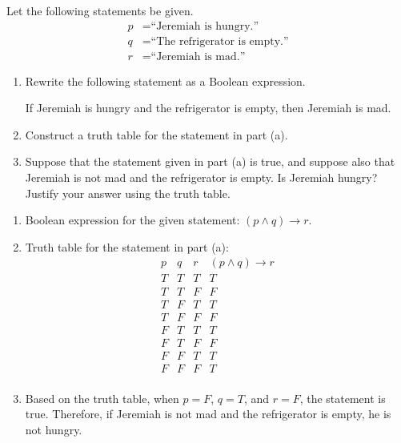 \documentclass{article}
\theoremstyle{definition}
\begin{document}
\begin{question}
	Let the following statements be given.
		\begin{align*}
		p &= \text{``Jeremiah is hungry.''}\\
		q &= \text{``The refrigerator is empty.''}\\
		r &= \text{``Jeremiah is mad.''}
		\end{align*}
	\begin{enumerate}
		\item Rewrite the following statement as a Boolean expression.\\
			\begin{center}
			If Jeremiah is hungry and the refrigerator is empty, then Jeremiah is mad.
			\end{center}
		\item Construct a truth table for the statement in part (a).
		\item Suppose that the statement given in part (a) is true, and suppose also that Jeremiah is not mad and the refrigerator is empty. Is Jeremiah hungry? Justify your answer using the truth table.
	\end{enumerate}
\end{question}
\begin{solution}
    \begin{enumerate}
        \item Boolean expression for the given statement: $(p \land q) \rightarrow r$.
        \item Truth table for the statement in part (a):
        \[
        \begin{array}{cccc}
            p & q & r & (p \land q) \rightarrow r \\
            \hline
            T & T & T & T \\
            T & T & F & F \\
            T & F & T & T \\
            T & F & F & F \\
            F & T & T & T \\
            F & T & F & F \\
            F & F & T & T \\
            F & F & F & T \\
        \end{array}
        \]
        \item Based on the truth table, when $p = F$, $q = T$, and $r = F$, the statement is true. Therefore, if Jeremiah is not mad and the refrigerator is empty, he is not hungry.
    \end{enumerate}
\end{solution}
\end{document}
